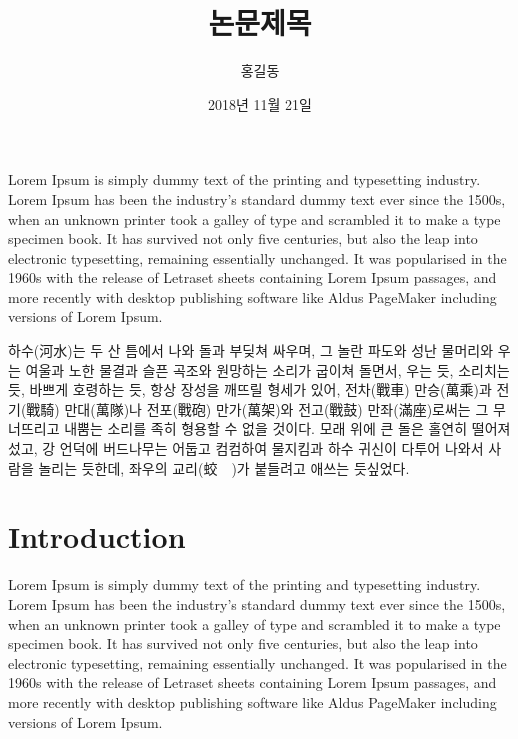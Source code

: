 \documentclass{thesis-SJ}
\title[English title]{논문제목}
\author[洪吉東]{홍길동}{Hong, Gil Dong}
\date{2018년 11월 21일}{November 21st, 2018}
\begin{document}
	\EnglishAbstract
	Lorem Ipsum is simply dummy text of the printing and typesetting industry. Lorem Ipsum has been the industry's standard dummy text ever since the 1500s, when an unknown printer took a galley of type and scrambled it to make a type specimen book. It has survived not only five centuries, but also the leap into electronic typesetting, remaining essentially unchanged. It was popularised in the 1960s with the release of Letraset sheets containing Lorem Ipsum passages, and more recently with desktop publishing software like Aldus PageMaker including versions of Lorem Ipsum.

	
	\KoreanAbstract
	하수(河水)는 두 산 틈에서 나와 돌과 부딪쳐 싸우며, 그 놀란 파도와 성난 물머리와 우는 여울과 노한 물결과 슬픈 곡조와 원망하는 소리가 굽이쳐 돌면서, 우는 듯, 소리치는 듯, 바쁘게 호령하는 듯, 항상 장성을 깨뜨릴 형세가 있어, 전차(戰車) 만승(萬乘)과 전기(戰騎) 만대(萬隊)나 전포(戰砲) 만가(萬架)와 전고(戰鼓) 만좌(滿座)로써는 그 무너뜨리고 내뿜는 소리를 족히 형용할 수 없을 것이다. 모래 위에 큰 돌은 홀연히 떨어져 섰고, 강 언덕에 버드나무는 어둡고 컴컴하여 물지킴과 하수 귀신이 다투어 나와서 사람을 놀리는 듯한데, 좌우의 교리(蛟　)가 붙들려고 애쓰는 듯싶었다.
	
	
	\tableofcontents
	
	\mainpartstart
	
	
	\chapter{Introduction} 
	
	Lorem Ipsum is simply dummy text of the printing and typesetting industry. Lorem Ipsum has been the industry's standard dummy text ever since the 1500s, when an unknown printer took a galley of type and scrambled it to make a type specimen book. It has survived not only five centuries, but also the leap into electronic typesetting, remaining essentially unchanged. It was popularised in the 1960s with the release of Letraset sheets containing Lorem Ipsum passages, and more recently with desktop publishing software like Aldus PageMaker including versions of Lorem Ipsum.
	
\end{document}
